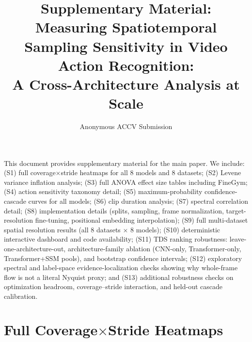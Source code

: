 \documentclass[runningheads]{llncs}
\newcommand{\TDS}{\textsc{TDS}}
\newcommand{\rev}[1]{\textcolor{revblue}{#1}}
\newcommand{\revdel}[1]{}
\begin{document}
\raggedbottom

\title{\texorpdfstring{Supplementary Material:\\
  \rev{Measuring Spatiotemporal Sampling Sensitivity in Video Action Recognition:\\
  A Cross-Architecture Analysis at Scale}}{Supplementary Material: Measuring Spatiotemporal Sampling Sensitivity in Video Action Recognition: A Cross-Architecture Analysis at Scale}}

\author{Anonymous ACCV Submission}
\institute{}
\maketitle

\setcounter{section}{0}
\renewcommand\thesection{S\arabic{section}}
\renewcommand\thefigure{S\arabic{figure}}
\renewcommand\thetable{S\arabic{table}}
\setcounter{figure}{0} \setcounter{table}{0}

This document provides supplementary material for the main paper. We include: (S1) full coverage$\times$stride heatmaps for all 8 models and 8 datasets; (S2) Levene variance inflation analysis; (S3) full ANOVA effect size tables including FineGym; (S4) action sensitivity taxonomy detail; (S5) \rev{maximum-probability confidence-cascade curves}\revdel{entropy routing curves} for all models; (S6) clip duration analysis; (S7) spectral correlation detail; (S8) implementation details (splits, sampling, frame normalization, target-resolution fine-tuning, positional embedding interpolation); (S9) full multi-dataset spatial resolution results (all 8 datasets $\times$ 8 models); (S10) deterministic interactive dashboard and code availability; (S11) \TDS{} ranking robustness: leave-one-architecture-out, architecture-family ablation (CNN-only, Transformer-only, Transformer+SSM pools), and bootstrap confidence intervals; (S12) exploratory spectral and label-space evidence-localization checks showing why whole-frame flow is not a literal Nyquist proxy; and (S13) additional robustness checks on optimization headroom, coverage--stride interaction, and \rev{held-out cascade calibration}\revdel{entropy-threshold calibration}.

\section{Full Coverage$\times$Stride Heatmaps}
\label{sec:sup_heatmaps}
\end{document}
